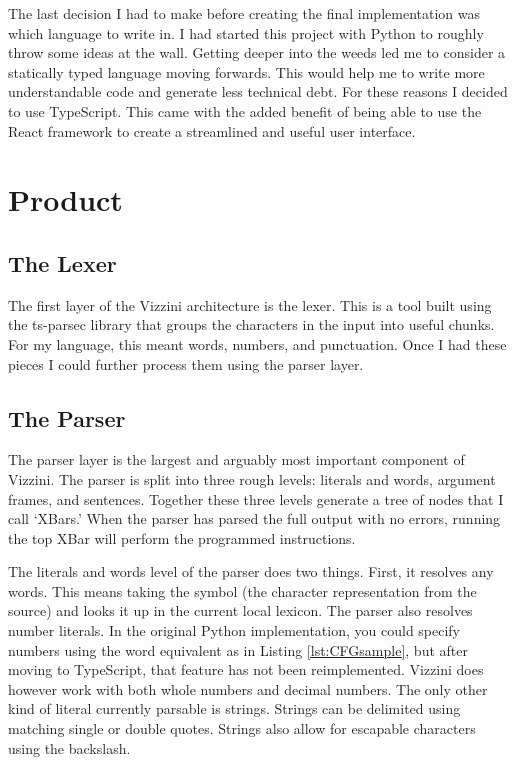 \documentclass[titlepage]{article}
\newcommand{\lstRef}[1]{Listing \ref{lst:#1}}
\newcommand{\langName}{Vizzini}
\begin{document}
The last decision I had to make before creating the final implementation was which language to write in. I had started this project with Python to roughly throw some ideas at the wall. Getting deeper into the weeds led me to consider a statically typed language moving forwards. This would help me to write more understandable code and generate less technical debt. For these reasons I decided to use TypeScript. This came with the added benefit of being able to use the React framework to create a streamlined and useful user interface. 

\section*{Product}
\subsection*{The Lexer}
The first layer of the \langName{} architecture is the lexer. This is a tool built using the ts-parsec library that groups the characters in the input into useful chunks. For my language, this meant words, numbers, and punctuation. Once I had these pieces I could further process them using the parser layer.

\subsection*{The Parser}
The parser layer is the largest and arguably most important component of \langName{}. The parser is split into three rough levels: literals and words, argument frames, and sentences. Together these three levels generate a tree of nodes that I call `XBars.' When the parser has parsed the full output with no errors, running the top XBar will perform the programmed instructions.

The literals and words level of the parser does two things. First, it resolves any words. This means taking the symbol (the character representation from the source) and looks it up in the current local lexicon. The parser also resolves number literals. In the original Python implementation, you could specify numbers using the word equivalent as in \lstRef{CFGsample}, but after moving to TypeScript, that feature has not been reimplemented. \langName{} does however work with both whole numbers and decimal numbers. The only other kind of literal currently parsable is strings. Strings can be delimited using matching single or double quotes. Strings also allow for escapable characters using the backslash.
\end{document}

